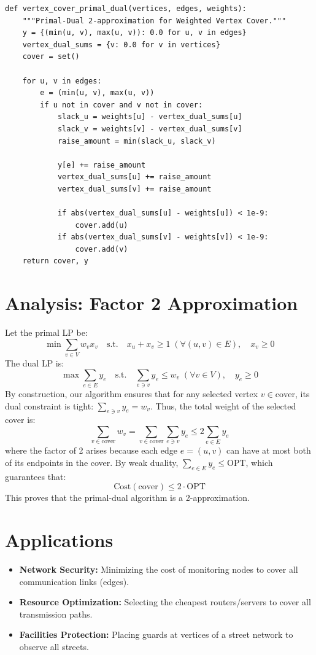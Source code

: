 \begin{lstlisting}[style=python, caption=Primal-Dual Schema for Weighted Vertex Cover]
def vertex_cover_primal_dual(vertices, edges, weights):
    """Primal-Dual 2-approximation for Weighted Vertex Cover."""
    y = {(min(u, v), max(u, v)): 0.0 for u, v in edges}
    vertex_dual_sums = {v: 0.0 for v in vertices}
    cover = set()
    
    for u, v in edges:
        e = (min(u, v), max(u, v))
        if u not in cover and v not in cover:
            slack_u = weights[u] - vertex_dual_sums[u]
            slack_v = weights[v] - vertex_dual_sums[v]
            raise_amount = min(slack_u, slack_v)
            
            y[e] += raise_amount
            vertex_dual_sums[u] += raise_amount
            vertex_dual_sums[v] += raise_amount
            
            if abs(vertex_dual_sums[u] - weights[u]) < 1e-9:
                cover.add(u)
            if abs(vertex_dual_sums[v] - weights[v]) < 1e-9:
                cover.add(v)
    return cover, y
\end{lstlisting}

\section{Analysis: Factor 2 Approximation}
Let the primal LP be:
\[
\min \sum_{v \in V} w_v x_v \quad \text{s.t.} \quad x_u + x_v \ge 1 \; (\forall (u,v) \in E), \quad x_v \ge 0
\]
The dual LP is:
\[
\max \sum_{e \in E} y_e \quad \text{s.t.} \quad \sum_{e \ni v} y_e \le w_v \; (\forall v \in V), \quad y_e \ge 0
\]
By construction, our algorithm ensures that for any selected vertex $v \in \text{cover}$, its dual constraint is tight: $\sum_{e \ni v} y_e = w_v$.
Thus, the total weight of the selected cover is:
\[
\sum_{v \in \text{cover}} w_v = \sum_{v \in \text{cover}} \sum_{e \ni v} y_e \le 2 \sum_{e \in E} y_e
\]
where the factor of 2 arises because each edge $e = (u,v)$ can have at most both of its endpoints in the cover. By weak duality, $\sum_{e \in E} y_e \le \text{OPT}$, which guarantees that:
\[
\text{Cost}(\text{cover}) \le 2 \cdot \text{OPT}
\]
This proves that the primal-dual algorithm is a 2-approximation.

\section{Applications}
\begin{itemize}
    \item \textbf{Network Security:} Minimizing the cost of monitoring nodes to cover all communication links (edges).
    \item \textbf{Resource Optimization:} Selecting the cheapest routers/servers to cover all transmission paths.
    \item \textbf{Facilities Protection:} Placing guards at vertices of a street network to observe all streets.
\end{itemize}

